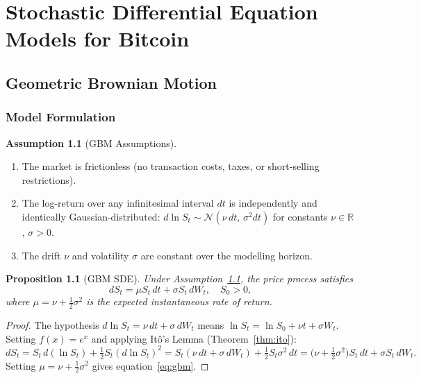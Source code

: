 \documentclass[12pt, a4paper, oneside]{report}
\theoremstyle{plain}
\newtheorem{proposition}[theorem]{Proposition}
\theoremstyle{definition}
\newtheorem{assumption}[theorem]{Assumption}
\theoremstyle{remark}
\newcommand{\R}{\mathbb{R}}
\begin{document}
\chapter{Stochastic Differential Equation Models for Bitcoin}
\label{ch:sde_models}

\section{Geometric Brownian Motion}
\label{sec:gbm}

\subsection{Model Formulation}

\begin{assumption}[GBM Assumptions]
\label{ass:gbm}
\begin{enumerate}[leftmargin=1.25cm, label=\textup{(G\arabic*)}]
  \item The market is frictionless (no transaction costs, taxes, or short-selling
    restrictions).
  \item The log-return over any infinitesimal interval $dt$ is independently and
    identically Gaussian-distributed:
    $d\ln S_t \sim \mathcal{N}(\nu\,dt,\, \sigma^2 dt)$ for constants
    $\nu \in \R$, $\sigma > 0$.
  \item The drift $\nu$ and volatility $\sigma$ are constant over the modelling
    horizon.
\end{enumerate}
\end{assumption}

\begin{proposition}[GBM SDE]
\label{prop:gbm_sde}
Under Assumption~\ref{ass:gbm}, the price process satisfies
\begin{equation}
\label{eq:gbm}
  dS_t = \mu S_t\,dt + \sigma S_t\,dW_t, \quad S_0 > 0,
\end{equation}
where $\mu = \nu + \frac{1}{2}\sigma^2$ is the expected instantaneous rate of return.
\end{proposition}

\begin{proof}
The hypothesis $d\ln S_t = \nu\,dt + \sigma\,dW_t$ means
$\ln S_t = \ln S_0 + \nu t + \sigma W_t$.  Setting $f(x) = e^x$ and
applying It\^{o}'s Lemma (Theorem~\ref{thm:ito}):
\[
  dS_t = S_t\,d(\ln S_t) + \tfrac{1}{2}S_t(d\ln S_t)^2
  = S_t(\nu\,dt + \sigma\,dW_t) + \tfrac{1}{2}S_t\sigma^2\,dt
  = \bigl(\nu + \tfrac{1}{2}\sigma^2\bigr)S_t\,dt + \sigma S_t\,dW_t.
\]
Setting $\mu = \nu + \frac{1}{2}\sigma^2$ gives equation~\eqref{eq:gbm}.
\end{proof}
\end{document}
